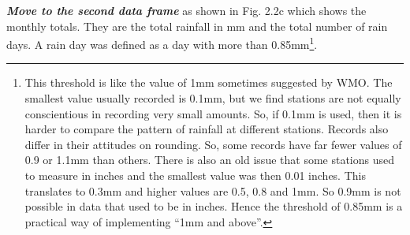\documentclass[
  letterpaper,
  DIV=11,
  numbers=noendperiod]{scrreprt}
\begin{document}
\textbf{\emph{Move to the second data frame}} as shown in Fig. 2.2c
which shows the monthly totals. They are the total rainfall in mm and
the total number of rain days. A rain day was defined as a day with more
than 0.85mm\footnote{This threshold is like the value of 1mm sometimes
  suggested by WMO. The smallest value usually recorded is 0.1mm, but we
  find stations are not equally conscientious in recording very small
  amounts. So, if 0.1mm is used, then it is harder to compare the
  pattern of rainfall at different stations. Records also differ in
  their attitudes on rounding. So, some records have far fewer values of
  0.9 or 1.1mm than others. There is also an old issue that some
  stations used to measure in inches and the smallest value was then
  0.01 inches. This translates to 0.3mm and higher values are 0.5, 0.8
  and 1mm. So 0.9mm is not possible in data that used to be in inches.
  Hence the threshold of 0.85mm is a practical way of implementing ``1mm
  and above''.}.
\end{document}

